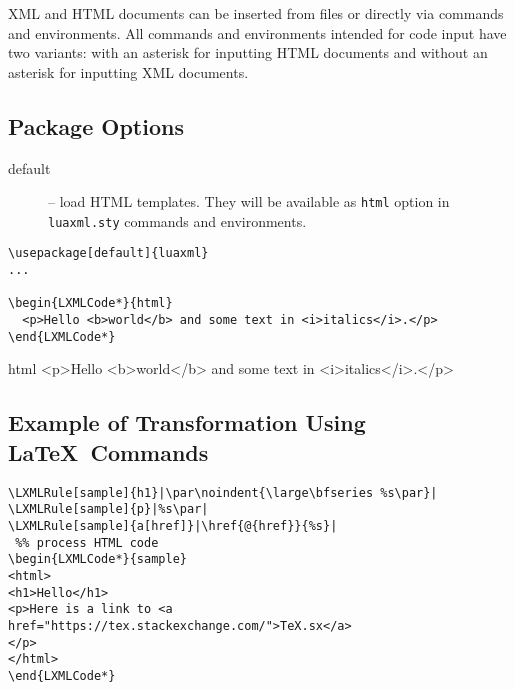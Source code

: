 \documentclass{ltxdoc}
\begin{document}
XML and HTML documents can be inserted from files or directly via commands and environments.
All commands and environments intended for code input have two variants: with
an asterisk for inputting HTML documents and without an asterisk for inputting
XML documents.

\subsection{Package Options}

\begin{description}
  \item[default] -- load HTML templates. They will be available as \verb|html|
  option in \verb|luaxml.sty| commands and environments.
\end{description}

\begin{verbatim}
\usepackage[default]{luaxml}
... 

\begin{LXMLCode*}{html}
  <p>Hello <b>world</b> and some text in <i>italics</i>.</p>
\end{LXMLCode*}
\end{verbatim}

\begin{framed}
\begin{LXMLCode*}{html}
  <p>Hello <b>world</b> and some text in <i>italics</i>.</p>
\end{LXMLCode*}
\end{framed}


\subsection{Example of Transformation Using \LaTeX\ Commands}

\begin{verbatim}
\LXMLRule[sample]{h1}|\par\noindent{\large\bfseries %s\par}|
\LXMLRule[sample]{p}|%s\par|
\LXMLRule[sample]{a[href]}|\href{@{href}}{%s}|
 %% process HTML code
\begin{LXMLCode*}{sample}
<html>
<h1>Hello</h1>
<p>Here is a link to <a href="https://tex.stackexchange.com/">TeX.sx</a>
</p>
</html>
\end{LXMLCode*}
\end{verbatim}
\end{document}

